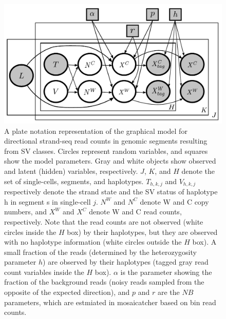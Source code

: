 \documentclass[12pt]{article}
\renewcommand{\j}{j} %
\newcommand{\X}{X} %
\renewcommand{\k}{k} %
\newcommand{\h}{h} %
\newcommand{\T}{T} %
\newcommand{\V}{V} %
\newcommand{\N}{N} %
\begin{document}
\begin{figure}
	\begin{center}
		\includegraphics[width=\textwidth]{graphical_model_v3_haplotagged-equal-sized-circle}
	\end{center}
\caption{A plate notation representation of the graphical model for directional strand-seq read counts in genomic segments resulting from SV classes. Circles represent random variables, and squares show the model parameters. Gray and white objects show observed and latent (hidden) variables, respectively. $J$, $K$, and $H$ denote the set of single-cells, segments, and haplotypes. $\T_{\h,\k,\j}$ and $\V_{\h,\k,\j}$ respectively denote the strand state and the SV status of haplotype h in segment s in single-cell $\j$. $\N^W$ and $\N^C$ denote W and C copy numbers, and $\X^W$ and $\X^C$ denote W and C read counts, respectively. Note that the read counts are not observed (white circles inside the $H$ box) by their haplotypes, but they are observed with no haplotype information (white circles outside the $H$ box). A small fraction of the reads (determined by the heterozygosity parameter $h$) are observed by their haplotypes (tagged gray read count variables inside the $H$ box). $\alpha$ is the parameter showing the fraction of the background reads (noisy reads sampled from the opposite of the expected direction), and $p$ and $r$ are the $NB$ parameters, which are estmiated in mosaicatcher based on bin read counts.}
\end{figure}
\end{document}
